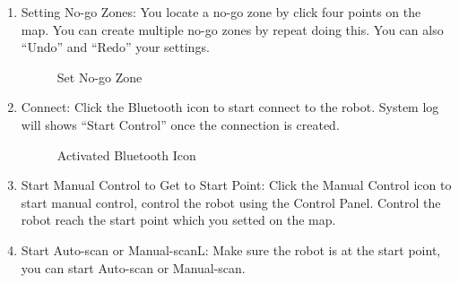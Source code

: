 \documentclass[11pt, a4paper]{report}
\begin{document}
\begin{enumerate}
	\item {Setting No-go Zones: }You locate a no-go zone by click four points on the map. You can create multiple no-go zones by repeat doing this. You can also ``Undo'' and ``Redo'' your settings.

														\begin{figure}[ht]
														\centering
														\setlength\fboxsep{2pt}
														\setlength\fboxrule{0.2pt}
														\caption{Set No-go Zone}
														\label{sec:sn}
														\label{fig:sn}
														\end{figure}
														\pagebreak
	\item {Connect: }Click the Bluetooth icon to start connect to the robot. System log will shows ``Start Control'' once the connection is created.
														\begin{figure}[ht]
														\centering
														\setlength\fboxsep{2pt}
														\setlength\fboxrule{0.2pt}
														\caption{Activated Bluetooth Icon}
														\label{sec:bi}
														\label{fig:bi}
														\end{figure}
	\item {Start Manual Control to Get to Start Point: }Click the Manual Control icon to start manual control, control the robot using the Control Panel. Control the robot reach the start point which you setted on the map.
	\item {Start Auto-scan or Manual-scanL: }Make sure the robot is at the start point, you can start Auto-scan or Manual-scan. 
														\begin{figure}[ht]

\end{figure}
\end{enumerate}
\end{document}
